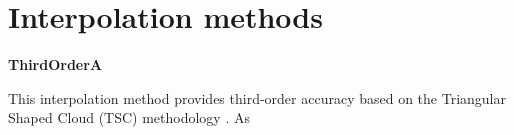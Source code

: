 \appendix
\section{Interpolation methods}


\vspace{0.3cm}\noindent
{\bf ThirdOrderA} 

This interpolation method provides third-order accuracy based on the
Triangular Shaped Cloud (TSC) methodology \citep{Hockney88}.  As
